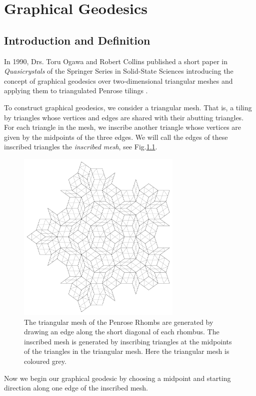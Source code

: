 \documentclass[
  oneside,
  11pt, a4paper,
  footinclude=true,
  headinclude=true,
  cleardoublepage=empty
]{scrbook}
\begin{document}
\chapter{Graphical Geodesics}
\section{Introduction and Definition}
In 1990, Drs. Toru Ogawa and Robert Collins published a short paper in \textit{Quasicrystals} of the Springer Series in Solid-State Sciences introducing the concept of graphical geodesics over two-dimensional triangular meshes and applying them to triangulated Penrose tilings \cite{Ogawa1999}. 

To construct graphical geodesics, we consider a triangular mesh. That is, a tiling by triangles whose vertices and edges are shared with their abutting triangles. For each triangle in the mesh, we inscribe another triangle whose vertices are given by the midpoints of the three edges. We will call the edges of these inscribed triangles the \textit{inscribed mesh}, see Fig.\ref{fig:inscribedmesh}.
\begin{figure}[H]
\centering
\includegraphics[width=0.7\textwidth]{InscribedMesh}
\caption[Inscribed Mesh]{The triangular mesh of the Penrose Rhombs are generated by drawing an edge along the short diagonal of each rhombus. The inscribed mesh is generated by inscribing triangles at the midpoints of the triangles in the triangular mesh. Here the triangular mesh is coloured grey.}
\label{fig:inscribedmesh}
\end{figure}
Now we begin our graphical geodesic by choosing a midpoint and starting direction along one edge of the inscribed mesh. 
\end{document}
